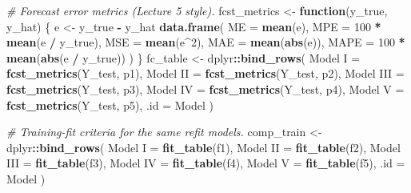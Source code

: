 \documentclass[
  10pt,
]{extarticle}
\newenvironment{Shaded}{\begin{snugshade}}{\end{snugshade}}
\newcommand{\AttributeTok}[1]{\textcolor[rgb]{0.13,0.29,0.53}{#1}}
\newcommand{\CommentTok}[1]{\textcolor[rgb]{0.56,0.35,0.01}{\textit{#1}}}
\newcommand{\ControlFlowTok}[1]{\textcolor[rgb]{0.13,0.29,0.53}{\textbf{#1}}}
\newcommand{\DecValTok}[1]{\textcolor[rgb]{0.00,0.00,0.81}{#1}}
\newcommand{\FunctionTok}[1]{\textcolor[rgb]{0.13,0.29,0.53}{\textbf{#1}}}
\newcommand{\NormalTok}[1]{#1}
\newcommand{\OtherTok}[1]{\textcolor[rgb]{0.56,0.35,0.01}{#1}}
\newcommand{\SpecialCharTok}[1]{\textcolor[rgb]{0.81,0.36,0.00}{\textbf{#1}}}
\newcommand{\StringTok}[1]{\textcolor[rgb]{0.31,0.60,0.02}{#1}}
\begin{document}
\begin{Shaded}
\begin{Highlighting}[]
\CommentTok{\# Forecast error metrics (Lecture 5 style).}
\NormalTok{fcst\_metrics }\OtherTok{\textless{}{-}} \ControlFlowTok{function}\NormalTok{(y\_true, y\_hat) \{}
\NormalTok{  e }\OtherTok{\textless{}{-}}\NormalTok{ y\_true }\SpecialCharTok{{-}}\NormalTok{ y\_hat}
  \FunctionTok{data.frame}\NormalTok{(}
    \AttributeTok{ME =} \FunctionTok{mean}\NormalTok{(e),}
    \AttributeTok{MPE =} \DecValTok{100} \SpecialCharTok{*} \FunctionTok{mean}\NormalTok{(e }\SpecialCharTok{/}\NormalTok{ y\_true),}
    \AttributeTok{MSE =} \FunctionTok{mean}\NormalTok{(e}\SpecialCharTok{\^{}}\DecValTok{2}\NormalTok{),}
    \AttributeTok{MAE =} \FunctionTok{mean}\NormalTok{(}\FunctionTok{abs}\NormalTok{(e)),}
    \AttributeTok{MAPE =} \DecValTok{100} \SpecialCharTok{*} \FunctionTok{mean}\NormalTok{(}\FunctionTok{abs}\NormalTok{(e }\SpecialCharTok{/}\NormalTok{ y\_true))}
\NormalTok{  )}
\NormalTok{\}}
\NormalTok{fc\_table }\OtherTok{\textless{}{-}}\NormalTok{ dplyr}\SpecialCharTok{::}\FunctionTok{bind\_rows}\NormalTok{(}
  \StringTok{\textquotesingle{}Model I\textquotesingle{}} \OtherTok{=} \FunctionTok{fcst\_metrics}\NormalTok{(Y\_test, p1),}
  \StringTok{\textquotesingle{}Model II\textquotesingle{}} \OtherTok{=} \FunctionTok{fcst\_metrics}\NormalTok{(Y\_test, p2),}
  \StringTok{\textquotesingle{}Model III\textquotesingle{}} \OtherTok{=} \FunctionTok{fcst\_metrics}\NormalTok{(Y\_test, p3),}
  \StringTok{\textquotesingle{}Model IV\textquotesingle{}} \OtherTok{=} \FunctionTok{fcst\_metrics}\NormalTok{(Y\_test, p4),}
  \StringTok{\textquotesingle{}Model V\textquotesingle{}} \OtherTok{=} \FunctionTok{fcst\_metrics}\NormalTok{(Y\_test, p5),}
  \AttributeTok{.id =} \StringTok{\textquotesingle{}Model\textquotesingle{}}
\NormalTok{)}

\CommentTok{\# Training{-}fit criteria for the same refit models.}
\NormalTok{comp\_train }\OtherTok{\textless{}{-}}\NormalTok{ dplyr}\SpecialCharTok{::}\FunctionTok{bind\_rows}\NormalTok{(}
  \StringTok{\textquotesingle{}Model I\textquotesingle{}} \OtherTok{=} \FunctionTok{fit\_table}\NormalTok{(f1),}
  \StringTok{\textquotesingle{}Model II\textquotesingle{}} \OtherTok{=} \FunctionTok{fit\_table}\NormalTok{(f2),}
  \StringTok{\textquotesingle{}Model III\textquotesingle{}} \OtherTok{=} \FunctionTok{fit\_table}\NormalTok{(f3),}
  \StringTok{\textquotesingle{}Model IV\textquotesingle{}} \OtherTok{=} \FunctionTok{fit\_table}\NormalTok{(f4),}
  \StringTok{\textquotesingle{}Model V\textquotesingle{}} \OtherTok{=} \FunctionTok{fit\_table}\NormalTok{(f5),}
  \AttributeTok{.id =} \StringTok{\textquotesingle{}Model\textquotesingle{}}
\NormalTok{)}


\end{Highlighting}
\end{Shaded}
\end{document}
